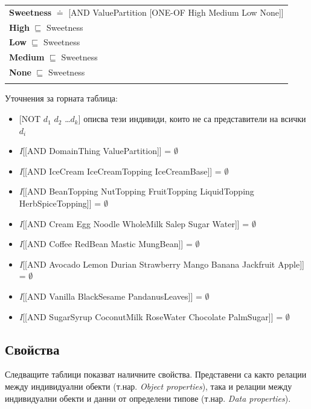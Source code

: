 \documentclass[12pt]{article}
\begin{document}
\begin{tabularx}{1\textwidth}{@{}X@{}}
            \textbf{Sweetness} $\doteq$ [AND ValuePartition [ONE-OF High Medium Low None]] \\            
            \textbf{High} $\sqsubseteq$ Sweetness \\
            \textbf{Low} $\sqsubseteq$ Sweetness \\
            \textbf{Medium} $\sqsubseteq$ Sweetness \\
            \textbf{None} $\sqsubseteq$ Sweetness \\
            \tabularnewline

        \bottomrule
        \end{tabularx}


    Уточнения за горната таблица:

        \begin{itemize} 
            \item{} [NOT $d_1$ $d_2$ \ldots $d_k$] описва тези индивиди, които не са представители на всички $d_i$
            \item{} \textit{I}[[AND DomainThing ValuePartition]] = $\emptyset$
            \item{} \textit{I}[[AND IceCream IceCreamTopping IceCreamBase]] = $\emptyset$
            \item{} \textit{I}[[AND BeanTopping NutTopping FruitTopping LiquidTopping HerbSpiceTopping]] = $\emptyset$
            \item{} \textit{I}[[AND Cream Egg Noodle WholeMilk Salep Sugar Water]] = $\emptyset$
            \item{} \textit{I}[[AND Coffee RedBean Mastic MungBean]] = $\emptyset$
            \item{} \textit{I}[[AND Avocado Lemon Durian Strawberry Mango Banana Jackfruit Apple]] = $\emptyset$
            \item{} \textit{I}[[AND Vanilla BlackSesame PandanusLeaves]] = $\emptyset$
            \item{} \textit{I}[[AND SugarSyrup CoconutMilk RoseWater Chocolate PalmSugar]] = $\emptyset$
        \end{itemize}
    
    \subsection{Свойства}

    Следващите таблици показват наличните свойства. Представени са както релации между индивидуални обекти (т.нар. \textit{Object properties}), така и релации между индивидуални обекти и данни от определени типове (т.нар. \textit{Data properties}).
    
\end{document}
